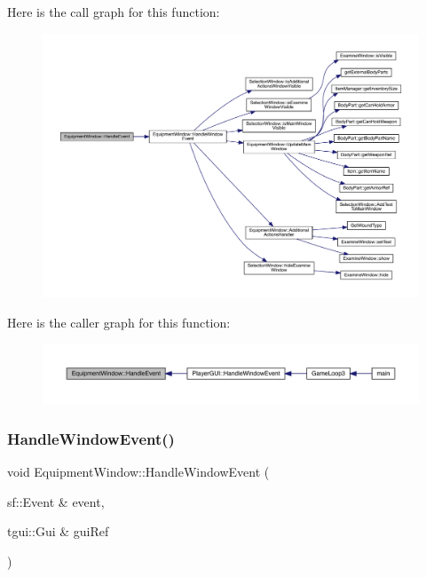 Here is the call graph for this function\+:
\nopagebreak
\begin{figure}[H]
\begin{center}
\leavevmode
\includegraphics[width=350pt]{d8/dcb/class_equipment_window_aea251bbf9967a0f39ccca5df854adcbe_cgraph}
\end{center}
\end{figure}
Here is the caller graph for this function\+:
\nopagebreak
\begin{figure}[H]
\begin{center}
\leavevmode
\includegraphics[width=350pt]{d8/dcb/class_equipment_window_aea251bbf9967a0f39ccca5df854adcbe_icgraph}
\end{center}
\end{figure}
\mbox{\label{class_equipment_window_a51ce202b7d1c4ac4e0e7d93df9dec726}} 
\subsubsection{\texorpdfstring{Handle\+Window\+Event()}{HandleWindowEvent()}}
{\footnotesize\ttfamily void Equipment\+Window\+::\+Handle\+Window\+Event (\begin{DoxyParamCaption}\item[{sf\+::\+Event \&}]{event,  }\item[{tgui\+::\+Gui \&}]{gui\+Ref }\end{DoxyParamCaption})}

